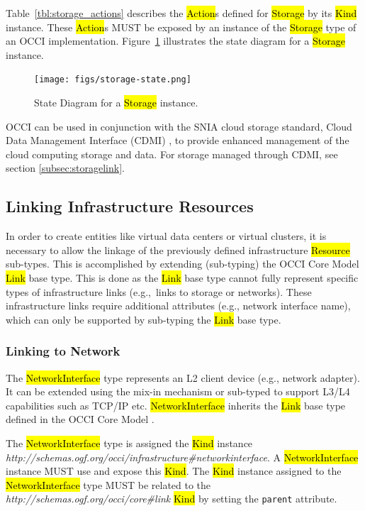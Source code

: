 \documentclass[10pt,a4paper]{article}
\begin{document}
Table~\ref{tbl:storage_actions} describes the \hl{Action}s defined for
\hl{Storage} by its \hl{Kind} instance. These \hl{Action}s MUST be
exposed by an instance of the \hl{Storage} type of an OCCI
implementation.  Figure~\ref{fig:storage_state} illustrates the state
diagram for a \hl{Storage} instance.

\begin{figure}[!h]
	\centering
	\texttt{[image: figs/storage-state.png]}
	\caption{State Diagram for a \hl{Storage} instance.}
	\label{fig:storage_state}
\end{figure}

OCCI can be used in conjunction with the SNIA cloud storage standard,
Cloud Data Management Interface (CDMI) \cite{cdmi}, to provide enhanced
management of the cloud computing storage and data. For storage
managed through CDMI, see section \ref{subsec:storagelink}.

\subsection{Linking Infrastructure Resources}
In order to create entities like virtual data centers or virtual
clusters, it is necessary to allow the linkage of the previously
defined infrastructure \hl{Resource} sub-types. This is accomplished
by extending (sub-typing) the OCCI Core Model \hl{Link} base type.
This is done as the \hl{Link} base type cannot fully represent
specific types of infrastructure links (e.g.,~links to storage or
networks).  These infrastructure links require additional attributes
(e.g., network interface name), which can only be supported by
sub-typing the \hl{Link} base type.

\subsubsection{Linking to Network}
The \hl{NetworkInterface} type represents an L2 client device (e.g.,
network adapter). It can be extended using the mix-in mechanism or
sub-typed to support L3/L4 capabilities such as TCP/IP etc.
\hl{NetworkInterface} inherits the \hl{Link} base type defined in the
OCCI Core Model \cite{occi:core}.

The \hl{NetworkInterface} type is assigned the \hl{Kind} instance
\textit{http://schemas.ogf.org/occi/infrastructure\#networkinterface}.
A \hl{NetworkInterface} instance MUST use and expose this \hl{Kind}.
The \hl{Kind} instance assigned to the \hl{NetworkInterface} type MUST
be related to the \textit{http://schemas.ogf.org/occi/core\#link}
\hl{Kind} by setting the \texttt{parent} attribute.
\end{document}
